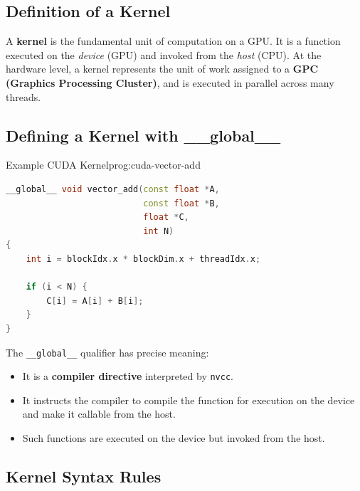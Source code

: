 \subsection{Definition of a Kernel}
A \textbf{kernel} is the fundamental unit of computation on a GPU. It is a function executed on the \emph{device} (GPU) and invoked from the \emph{host} (CPU). At the hardware level, a kernel represents the unit of work assigned to a \textbf{GPC (Graphics Processing Cluster)}, and is executed in parallel across many threads.

\subsection{Defining a Kernel with \_\_global\_\_}

\begin{ppprogram}{Example CUDA Kernel}{prog:cuda-vector-add}
\begin{lstlisting}[language=C++]
__global__ void vector_add(const float *A,
                           const float *B,
                           float *C,
                           int N)
{
    int i = blockIdx.x * blockDim.x + threadIdx.x;

    if (i < N) {
        C[i] = A[i] + B[i];
    }
}
\end{lstlisting}
\end{ppprogram}

\begin{ppnote}
The \verb|__global__| qualifier has precise meaning:
\begin{itemize}
    \item It is a \textbf{compiler directive} interpreted by \texttt{nvcc}.
    \item It instructs the compiler to compile the function for execution on the device and make it callable from the host.
    \item Such functions are executed on the device but invoked from the host.
\end{itemize}
\end{ppnote}

\subsection{Kernel Syntax Rules}

